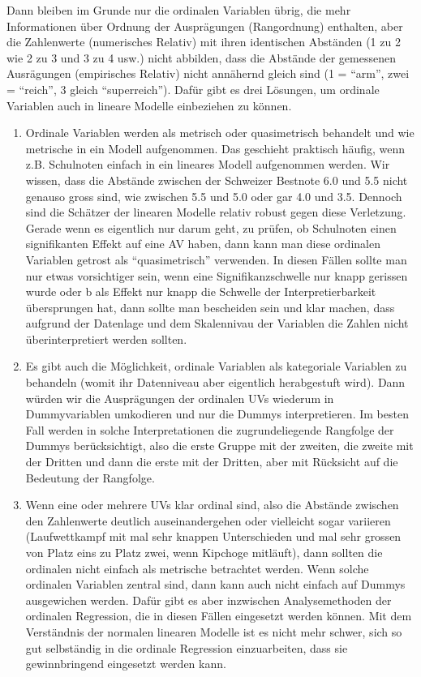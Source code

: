 \documentclass[
  10pt,
  letterpaper,
  a4paper, twoside]{scrreprt}
\begin{document}
Dann bleiben im Grunde nur die ordinalen Variablen übrig, die mehr
Informationen über Ordnung der Ausprägungen (Rangordnung) enthalten,
aber die Zahlenwerte (numerisches Relativ) mit ihren identischen
Abständen (1 zu 2 wie 2 zu 3 und 3 zu 4 usw.) nicht abbilden, dass die
Abstände der gemessenen Ausrägungen (empirisches Relativ) nicht
annähernd gleich sind (1 = \enquote{arm}, zwei = \enquote{reich}, 3
gleich \enquote{superreich}). Dafür gibt es drei Lösungen, um ordinale
Variablen auch in lineare Modelle einbeziehen zu können.

\begin{enumerate}
\def\labelenumi{\arabic{enumi}.}
\item
  Ordinale Variablen werden als metrisch oder quasimetrisch behandelt
  und wie metrische in ein Modell aufgenommen. Das geschieht praktisch
  häufig, wenn z.B. Schulnoten einfach in ein lineares Modell
  aufgenommen werden. Wir wissen, dass die Abstände zwischen der
  Schweizer Bestnote 6.0 und 5.5 nicht genauso gross sind, wie zwischen
  5.5 und 5.0 oder gar 4.0 und 3.5. Dennoch sind die Schätzer der
  linearen Modelle relativ robust gegen diese Verletzung. Gerade wenn es
  eigentlich nur darum geht, zu prüfen, ob Schulnoten einen
  signifikanten Effekt auf eine AV haben, dann kann man diese ordinalen
  Variablen getrost als \enquote{quasimetrisch} verwenden. In diesen
  Fällen sollte man nur etwas vorsichtiger sein, wenn eine
  Signifikanzschwelle nur knapp gerissen wurde oder b als Effekt nur
  knapp die Schwelle der Interpretierbarkeit übersprungen hat, dann
  sollte man bescheiden sein und klar machen, dass aufgrund der
  Datenlage und dem Skalennivau der Variablen die Zahlen nicht
  überinterpretiert werden sollten.
\item
  Es gibt auch die Möglichkeit, ordinale Variablen als kategoriale
  Variablen zu behandeln (womit ihr Datenniveau aber eigentlich
  herabgestuft wird). Dann würden wir die Ausprägungen der ordinalen UVs
  wiederum in Dummyvariablen umkodieren und nur die Dummys
  interpretieren. Im besten Fall werden in solche Interpretationen die
  zugrundeliegende Rangfolge der Dummys berücksichtigt, also die erste
  Gruppe mit der zweiten, die zweite mit der Dritten und dann die erste
  mit der Dritten, aber mit Rücksicht auf die Bedeutung der Rangfolge.
\item
  Wenn eine oder mehrere UVs klar ordinal sind, also die Abstände
  zwischen den Zahlenwerte deutlich auseinandergehen oder vielleicht
  sogar variieren (Laufwettkampf mit mal sehr knappen Unterschieden und
  mal sehr grossen von Platz eins zu Platz zwei, wenn Kipchoge
  mitläuft), dann sollten die ordinalen nicht einfach als metrische
  betrachtet werden. Wenn solche ordinalen Variablen zentral sind, dann
  kann auch nicht einfach auf Dummys ausgewichen werden. Dafür gibt es
  aber inzwischen Analysemethoden der ordinalen Regression, die in
  diesen Fällen eingesetzt werden können. Mit dem Verständnis der
  normalen linearen Modelle ist es nicht mehr schwer, sich so gut
  selbständig in die ordinale Regression einzuarbeiten, dass sie
  gewinnbringend eingesetzt werden kann.
\end{enumerate}
\end{document}
